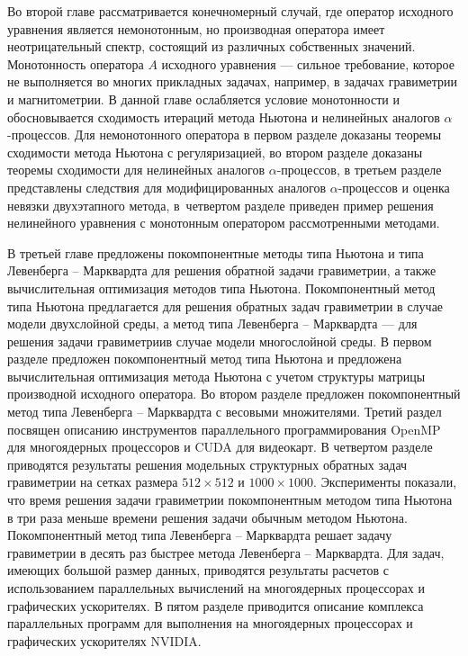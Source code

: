 Во второй главе рассматривается конечномерный случай, где оператор исходного уравнения является немонотонным, но производная оператора имеет неотрицательный спектр, состоящий из различных собственных значений. Монотонность оператора $A$ исходного уравнения --- сильное требование, которое не выполняется во многих прикладных задачах, например, в задачах гравиметрии и магнитометрии. В данной главе ослабляется условие монотонности и обосновывается сходимость итераций метода Ньютона и нелинейных аналогов $\alpha$-процессов. Для немонотонного оператора в первом разделе доказаны теоремы сходимости метода Ньютона с регуляризацией, во втором разделе доказаны теоремы сходимости для нелинейных аналогов $\alpha$-процессов, в третьем разделе представлены следствия для модифицированных аналогов $\alpha$-процессов и оценка невязки двухэтапного метода, в~четвертом разделе приведен пример решения нелинейного уравнения с монотонным оператором рассмотренными методами.

В третьей главе предложены покомпонентные методы типа Ньютона и типа Левенберга -- Марквардта для решения обратной задачи гравиметрии, а также вычислительная оптимизация методов типа Ньютона. Покомпонентный метод типа Ньютона предлагается для решения обратных задач гравиметрии в случае модели двухслойной среды, а метод типа Левенберга -- Марквардта --- для решения задачи гравиметриив случае модели многослойной среды. В первом разделе предложен покомпонентный метод типа Ньютона и предложена вычислительная оптимизация метода Ньютона с учетом структуры матрицы производной исходного оператора. Во втором разделе предложен покомпонентный метод типа Левенберга -- Марквардта с весовыми множителями. Третий раздел посвящен описанию инструментов параллельного программирования OpenMP для многоядерных процессоров и CUDA для видеокарт. В четвертом разделе приводятся результаты решения модельных структурных обратных задач гравиметрии на сетках размера $512\times 512$ и $1000\times 1000$. Эксперименты показали, что время решения задачи гравиметрии покомпонентным методом типа Ньютона в три раза меньше времени решения задачи обычным методом Ньютона. Покомпонентный метод типа Левенберга -- Марквардта решает задачу гравиметрии в десять раз быстрее метода Левенберга -- Марквардта. Для задач, имеющих большой размер данных, приводятся результаты расчетов с использованием параллельных вычислений на многоядерных процессорах и графических ускорителях. В пятом разделе приводится описание комплекса параллельных программ для выполнения на многоядерных процессорах и графических ускорителях NVIDIA.

